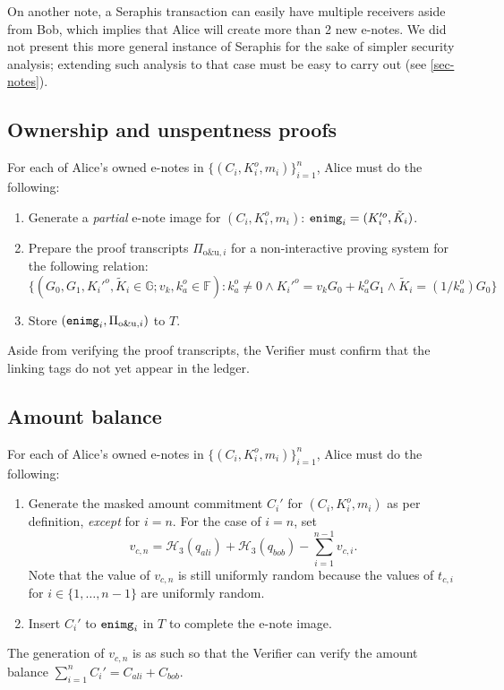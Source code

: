 \documentclass{article}
\begin{document}
On another note, a Seraphis transaction can easily have multiple receivers aside from Bob, which implies that Alice will create more than 2 new e-notes. We did not present this more general instance of Seraphis for the sake of simpler security analysis; extending such analysis to that case must be easy to carry out (see \ref{sec-notes}).

\subsection{Ownership and unspentness proofs}
For each of Alice's owned e-notes in $\{(C_i,K_i^o,m_i)\}_{i=1}^n$, Alice must do the following:
\begin{enumerate}
    \item Generate a \textit{partial} e-note image for $(C_i, K_i^o, m_i)$: ${\tt enimg}_i=(K_i'^o, \tilde{K}_i)$.
    \item Prepare the proof transcripts $\Pi_{\text{o\&u}, i}$ for a non-interactive proving system for the following relation:
$$\{(G_0, G_1, K_i'^o, \tilde{K}_i\in\mathbb{G}; v_k, k_a^o\in\mathbb{F}): k_a^o \ne 0 \wedge K_i'^o = v_k G_0 + k_a^o G_1 \wedge \tilde{K}_i = (1/k_a^o)G_0 \}$$
    \item Store $({\tt enimg}_i, \Pi_{\text{o\&u}, i})$ to $T$.
\end{enumerate}
Aside from verifying the proof transcripts, the Verifier must confirm that the linking tags do not yet appear in the ledger.

\subsection{Amount balance}
For each of Alice's owned e-notes in $\{(C_i,K_i^o,m_i)\}_{i=1}^n$, Alice must do the following:
\begin{enumerate}
    \item Generate the masked amount commitment $C_i'$ for $(C_i, K_i^o, m_i)$ as per definition, \textit{except} for $i=n$. For the case of $i=n$, set
    $$v_{c,n} = \mathcal{H}_3(q_{ali}) + \mathcal{H}_3(q_{bob}) - \sum_{i=1}^{n-1}{v_{c,i}}.$$
    Note that the value of $v_{c,n}$ is still uniformly random because the values of $t_{c,i}$ for $i\in\{1,\ldots,n-1\}$ are uniformly random.
    \item Insert $C_i'$ to ${\tt enimg}_i$ in $T$ to complete the e-note image.
\end{enumerate}
The generation of $v_{c,n}$ is as such so that the Verifier can verify the amount balance $\sum_{i=1}^n{C_i'}=C_{ali}+C_{bob}$.
\end{document}
